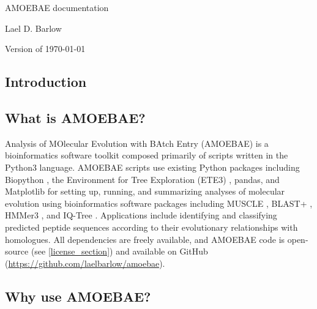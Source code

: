 \documentclass[12pt,letterpaper]{article}
\begin{document}
\begin{titlepage}
	\centering
    {\huge AMOEBAE documentation\par}
	\vspace{2cm}
    {\Large Lael D. Barlow\par}
	\vfill
	{\large Version of \today\par}
\end{titlepage}

\newpage
\tableofcontents

\newpage
{}
\begin{linenumbers}

\section{Introduction}


\subsection{What is AMOEBAE?}

Analysis of MOlecular Evolution with BAtch Entry (AMOEBAE) is a bioinformatics
    software toolkit composed primarily of scripts written in the Python3
    language.  AMOEBAE scripts use existing Python packages including Biopython
    \citep{cock2009}, the Environment for Tree Exploration (ETE3)
    \citep{huerta-cepas2016}, pandas, and Matplotlib \citep{hunter2007} for
    setting up, running, and summarizing analyses of molecular evolution using
    bioinformatics software packages including MUSCLE \citep{edgar2004}, BLAST+
    \citep{camacho2009}, HMMer3 \citep{eddy1998}, and IQ-Tree
    \citep{nguyen2015}. Applications include identifying and classifying
    predicted peptide sequences according to their evolutionary relationships
    with homologues. All dependencies are freely available, and AMOEBAE code is
    open-source (see \autoref*{license_section}) and available on GitHub
    (\url{https://github.com/laelbarlow/amoebae}). 

\subsection{Why use AMOEBAE?}


\end{linenumbers}
\end{document}
